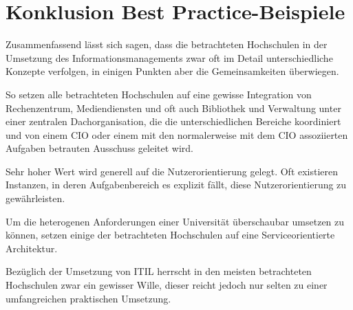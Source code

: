 \section{Konklusion Best Practice-Beispiele}
Zusammenfassend lässt sich sagen, dass die betrachteten Hochschulen in der Umsetzung des Informationsmanagements zwar oft im Detail unterschiedliche Konzepte verfolgen, in einigen Punkten aber die Gemeinsamkeiten überwiegen.

So setzen alle betrachteten Hochschulen auf eine gewisse Integration von Rechenzentrum, Mediendiensten und oft auch Bibliothek und Verwaltung unter einer zentralen Dachorganisation, die die unterschiedlichen Bereiche koordiniert und von einem CIO oder einem mit den normalerweise mit dem CIO assoziierten Aufgaben betrauten Ausschuss geleitet wird.

Sehr hoher Wert wird generell auf die Nutzerorientierung gelegt. Oft existieren Instanzen, in deren Aufgabenbereich es explizit fällt, diese Nutzerorientierung zu gewährleisten.

Um die heterogenen Anforderungen einer Universität überschaubar umsetzen zu können, setzen einige der betrachteten Hochschulen auf eine Serviceorientierte Architektur.

Bezüglich der Umsetzung von ITIL herrscht in den meisten betrachteten Hochschulen zwar ein gewisser Wille, dieser reicht jedoch nur selten zu einer umfangreichen praktischen Umsetzung.